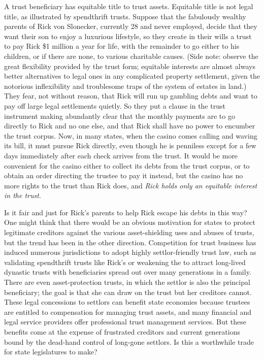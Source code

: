 
\item A trust beneficiary has equitable title to trust assets. Equitable title
is not legal title, as illustrated by spendthrift trusts. Suppose that the
fabulously wealthy parents of Rick von Slonecker, currently 28 and never
employed, decide that they want their son to enjoy a luxurious lifestyle, so
they create in their wills a trust to pay Rick \$1 million a year for life, with
the remainder to go either to his children, or if there are none, to various
charitable causes. (Side note: observe the great flexibility provided by the
trust form; equitable interests are almost always better alternatives to legal
ones in any complicated property settlement, given the notorious inflexibility
and troublesome traps of the system of estates in land.) They fear, not without
reason, that Rick will run up gambling debts and want to pay off large legal
settlements quietly. So they put a clause in the trust instrument making
abundantly clear that the monthly payments are to go directly to Rick and no one
else, and that Rick shall have no power to encumber the trust corpus. Now, in
many states, when the casino comes calling and waving its bill, it must pursue
Rick directly, even though he is penniless except for a few days immediately
after each check arrives from the trust. It would be more convenient for the
casino either to collect its debts from the trust corpus, or to obtain an order
directing the trustee to pay it instead, but the casino has no more rights to
the trust than Rick does, and \textit{Rick holds only an equitable interest in
the trust}. 


Is it fair and just for Rick's parents to help Rick escape his debts in this
way? One might think that there would be an obvious motivation for states to
protect legitimate creditors against the various asset-shielding uses and abuses
of trusts, but the trend has been in the other direction. Competition for trust
business has induced numerous jurisdictions to adopt highly settlor-friendly
trust law, such as validating spendthrift trusts like Rick's or weakening the
 to attract long-lived dynastic trusts with
beneficiaries spread out over many generations in a family. There are even
asset-protection trusts, in which the settlor is also the principal beneficiary;
the goal is that she can draw on the trust but her creditors cannot. These legal
concessions to settlors can benefit state economies because trustees are
entitled to compensation for managing trust assets, and many financial and legal
service providers offer professional trust management services. But these
benefits come at the expense of frustrated creditors and current generations
bound by the dead-hand control of long-gone settlors. Is this a worthwhile trade
for state legislatures to make?

